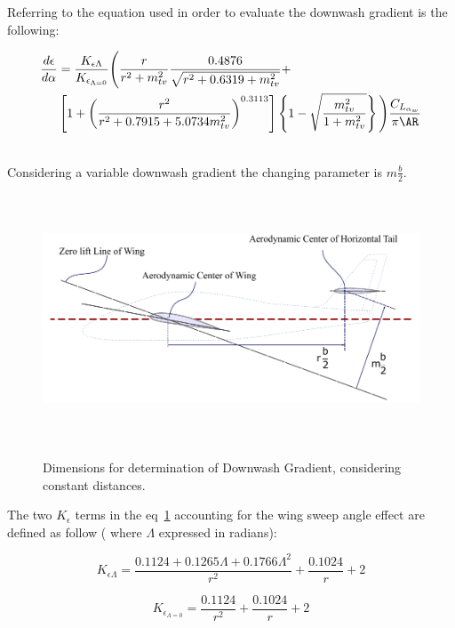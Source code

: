 Referring to %
the equation used in order to evaluate the downwash gradient is the following: 

\begin{equation}
\begin{split}
 \frac{d\epsilon}{d\alpha} &= \frac{K_{\epsilon \Lambda}}{K_{\epsilon _{\Lambda=0}}}  \Biggr ( \frac{r}{r^2+m_{tv}^2} 
 \frac{0.4876}{\sqrt{r^2 + 0.6319 + m_{tv}^2}}  +\\
& \left [1+{ \left( \frac{r^2}{r^2 + 0.7915 + 5.0734 m_{tv}^2} \right) }^{0.3113}  \right ]    \left \{ 1- \sqrt{\frac{m_{tv}^2}{1+m_{tv}^2}} \right \}      \Biggl )    \frac{C_{L_{{\alpha}_w}}}{\pi \AR}
\end{split}
\end{equation}

\noindent \\
Considering a variable downwash gradient the changing parameter is $m \frac{b}{2}$.

\begin{figure}[H]
\centering
{\includegraphics[height=7.4cm]{Immagini/wing_htail_Roskam_eng.pdf}} 
\caption{Dimensions for determination of Downwash Gradient, considering constant distances.}
\label{PerkinsDownwash}
\end{figure} 

The two $K_{\epsilon}$ terms in the eq~\ref{PerkinsDownwash} accounting for the wing sweep angle effect are defined as follow ( where $\Lambda $ expressed in radians):

\begin{equation}
K_{\epsilon \Lambda} = \frac{ 0.1124 + 0.1265 \Lambda + 0.1766 \Lambda^2}{r^2} + \frac{0.1024}{r} +2
\end{equation}

\begin{equation}
K_{\epsilon _{\Lambda=0}} = \frac{ 0.1124 }{r^2} + \frac{0.1024}{r} +2
\end{equation}

